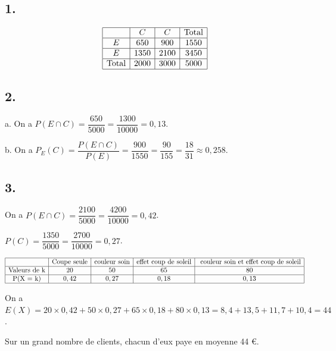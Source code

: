 \subsection*{1.}
	
	\[
	\begin{array}{|c|c|c|c|}
		\hline
		& C & C &\text{Total} \\
		\hline
		E & 650 & 900 & 1550 \\
		\hline
		E & 1350 & 2100 & 3450 \\
		\hline
		\text{Total} & 2000 & 3000 & 5000 \\
		\hline
	\end{array}
	\]
	
	\subsection*{2.}
	
	a. On a \(P(E \cap C) = \dfrac{650}{5000} = \dfrac{1300}{10000} = 0,13\).
	
	b. On a \(P_E(C) = \dfrac{P(E \cap C)}{P(E)} = \dfrac{900}{1550} = \dfrac{90}{155} = \dfrac{18}{31} \approx 0,258\).
	
	\subsection*{3.}
	
	On a \(P(E \cap C) = \dfrac{2100}{5000} = \dfrac{4200}{10000} = 0,42\).
	
	\(P(C) = \dfrac{1350}{5000} = \dfrac{2700}{10000} = 0,27\).
	
	\[
	\begin{array}{|c|c|c|c|c|}
		\hline
		&\text{Coupe seule} & \text{couleur soin} & \text{effet coup de soleil} & \text{ couleur soin et effet coup de soleil} \\
		\hline
		\text{Valeurs de k} & 20 & 50 & 65 & 80 \\
		\hline
		\text{P(X = k)} & 0,42 & 0,27 & 0,18 & 0,13 \\
		\hline
	\end{array}
	\]
	
	On a \(E(X) = 20 \times 0,42 + 50 \times 0,27 + 65 \times 0,18 + 80 \times 0,13 = 8,4 + 13,5 + 11,7 + 10,4 = 44\).
	
	Sur un grand nombre de clients, chacun d’eux paye en moyenne 44 €.
